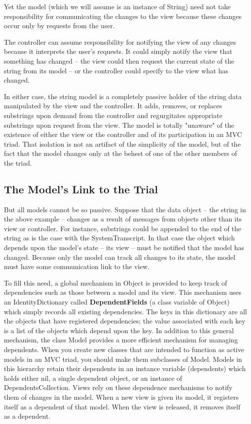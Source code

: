 \documentclass[a4paper, 11pt]{book}
\begin{document}
Yet the model (which we will assume is an instance of String) need not take 
responsibility for communicating the
changes to the view because these changes occur only by requests from the user.

The controller can assume responsibility for notifying the view of any changes
because it interprets the user's requests. It could simply notify the view that
something has changed -- the view could then request the current state of the
string from its model -- or the controller could specify to the view what has
changed. 

In either case, the string model is a completely passive holder of the
string data manipulated by the view and the controller. It adds, removes, or
replaces substrings upon demand from the controller and regurgitates appropriate
substrings upon request from the view. The model is totally "unaware" of the
existence of either the view or the controller and of its participation in an
MVC triad. That isolation is not an artifact of the simplicity of the model, but
of the fact that the model changes only at the behest of one of the other
members of the triad.

\subsection{The Model's Link to the Trial}
But all models cannot be so passive. Suppose that the data object -- the string
in the above example -- changes as a result of messages from objects other than
its view or controller. For instance, substrings could be appended to the end of
the string as is the case with the SystemTranscript. In that case the object
which depends upon the model's state -- its view -- must be notified that the
model has changed. Because only the model can track all changes to its state,
the model must have some communication link to the view.

 To fill this need, a
global mechanism in Object is provided to keep track of dependencies such as
those between a model and its view. This mechanism uses an IdentityDictionary
called \textbf{DependentFields} (a class variable of Object) which simply records all
existing dependencies. The keys in this dictionary are all the objects that have
registered dependencies; the value associated with each key is a list of the
objects which depend upon the key. In addition to this general mechanism, the
class Model provides a more efficient mechanism for managing dependents. When
you create new classes that are intended to function as active models in an MVC
triad, you should make them subclasses of Model. Models in this hierarchy retain
their dependents in an instance variable (dependents) which holds either nil, a
single dependent object, or an instance of DependentsCollection. Views rely on
these dependence mechanisms to notify them of changes in the model. When a new
view is given its model, it registers itself as a dependent of that model. When
the view is released, it removes itself as a dependent.
\end{document}
